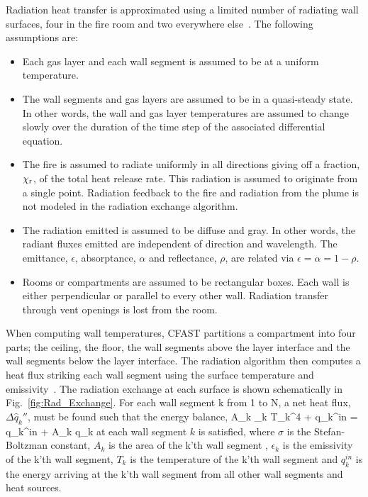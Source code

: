 Radiation heat transfer is approximated using a limited number of radiating wall surfaces, four in the fire room and two everywhere else~\cite{Forney_radiation}. The following assumptions are:
\begin{itemize}
\item Each gas layer and each wall segment is assumed to be at a uniform temperature.
\item The wall segments and gas layers are assumed to be in a quasi-steady state.  In other words, the wall and gas layer temperatures are assumed to change slowly over the duration of the time step of the associated differential equation.
\item The fire is assumed to radiate uniformly in all directions giving off a fraction, $\chi_{\rm r}$, of the total heat release rate.  This radiation is assumed to originate from a single point.  Radiation feedback to the fire and radiation from the plume is not modeled in the radiation exchange algorithm.
\item The radiation emitted is assumed to be diffuse and gray.  In other words, the radiant fluxes emitted are independent of direction and wavelength. The emittance, $\epsilon$, absorptance, $\alpha$ and reflectance, $\rho$, are related via $\epsilon = \alpha = 1 - \rho$.
\item Rooms or compartments are assumed to be rectangular boxes.  Each wall is either perpendicular or parallel to every other wall.  Radiation transfer through vent openings is lost from the room.
\end{itemize}
When computing wall temperatures, CFAST partitions a compartment into four parts; the ceiling, the floor, the wall segments above the layer interface and the wall segments below the layer interface.  The radiation algorithm then computes a heat flux striking each wall segment using the surface temperature and emissivity~\cite{SiegelandHowell:1981}. The radiation exchange at each surface is shown schematically in Fig.~\ref{fig:Rad_Exchange}.  For each wall segment k from 1 to N, a net heat flux, $\Delta \hat{q}_k\dprime$, must be found such that the energy balance,
\be 
   \sigma A_k \epsilon_k T_k^4 + q_k^{in} = q_k^{in} + A_k \Delta q_k\dprime 
\ee
at each wall segment $k$ is satisfied, where $\sigma$ is the Stefan-Boltzman constant, $A_k$ is the area of the k'th wall segment , $\epsilon_k$ is the emissivity of the k'th wall segment, $T_k$ is the temperature of the k'th wall segment and $q_k^{in}$ is the energy arriving at the k'th wall segment from all other wall segments and heat sources.

